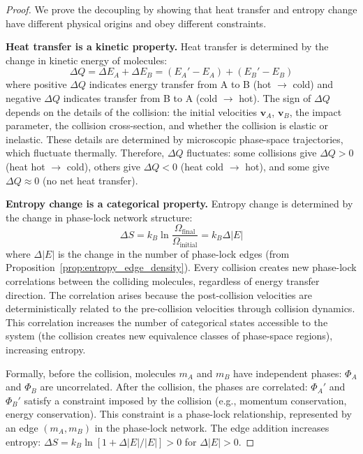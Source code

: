 \documentclass[12pt,a4paper]{article}
\theoremstyle{definition}
\theoremstyle{remark}
\begin{document}
\begin{proof}
We prove the decoupling by showing that heat transfer and entropy change have different physical origins and obey different constraints.

\textbf{Heat transfer is a kinetic property.}
Heat transfer is determined by the change in kinetic energy of molecules:
\begin{equation}
\Delta Q = \Delta E_A + \Delta E_B = (E_A' - E_A) + (E_B' - E_B)
\end{equation}
where positive $\Delta Q$ indicates energy transfer from A to B (hot $\to$ cold) and negative $\Delta Q$ indicates transfer from B to A (cold $\to$ hot). The sign of $\Delta Q$ depends on the details of the collision: the initial velocities $\mathbf{v}_A$, $\mathbf{v}_B$, the impact parameter, the collision cross-section, and whether the collision is elastic or inelastic. These details are determined by microscopic phase-space trajectories, which fluctuate thermally. Therefore, $\Delta Q$ fluctuates: some collisions give $\Delta Q > 0$ (heat hot $\to$ cold), others give $\Delta Q < 0$ (heat cold $\to$ hot), and some give $\Delta Q \approx 0$ (no net heat transfer).

\textbf{Entropy change is a categorical property.}
Entropy change is determined by the change in phase-lock network structure:
\begin{equation}
\Delta S = k_B \ln \frac{\Omega_{\text{final}}}{\Omega_{\text{initial}}} = k_B \Delta |E|
\end{equation}
where $\Delta |E|$ is the change in the number of phase-lock edges (from Proposition~\ref{prop:entropy_edge_density}). Every collision creates new phase-lock correlations between the colliding molecules, regardless of energy transfer direction. The correlation arises because the post-collision velocities are deterministically related to the pre-collision velocities through collision dynamics. This correlation increases the number of categorical states accessible to the system (the collision creates new equivalence classes of phase-space regions), increasing entropy.

Formally, before the collision, molecules $m_A$ and $m_B$ have independent phases: $\Phi_A$ and $\Phi_B$ are uncorrelated. After the collision, the phases are correlated: $\Phi_A'$ and $\Phi_B'$ satisfy a constraint imposed by the collision (e.g., momentum conservation, energy conservation). This constraint is a phase-lock relationship, represented by an edge $(m_A, m_B)$ in the phase-lock network. The edge addition increases entropy: $\Delta S = k_B \ln[1 + \Delta |E| / |E|] > 0$ for $\Delta |E| > 0$.


\end{proof}
\end{document}
